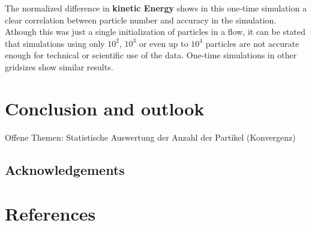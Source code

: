 \documentclass[11pt,a4paper,openany,oneside,parskip=half*]{article}
\begin{document}
The normalized difference in \textbf{kinetic Energy} shows in this one-time simulation a clear correlation between particle number and accuracy in the simulation. Athough this was just a single initialization of particles in a flow, it can be stated that simulations using only $10^2$, $10^3$ or even up to $10^4$ particles are not accurate enough for technical or scientific use of the data. One-time simulations in other gridsizes show similar results.
\pagebreak
\section{Conclusion and outlook}
Offene Themen: Statistische Auswertung der Anzahl der Partikel (Konvergenz)
\subsection*{Acknowledgements}
\pagebreak
\section{References}
\nocite{*} %
\pagebreak
\end{document}
